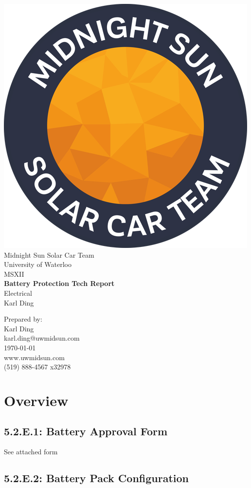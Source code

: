 \documentclass[10pt]{article}
\makeatletter
\newcommand\theteamname{Midnight Sun Solar Car Team} %
\newcommand\theuniversityname{University of Waterloo} %
\newcommand\theteamwebsite{www.uwmidsun.com} %
\newcommand\theteamphone{(519) 888-4567 x32978} %
\newcommand\thetitle{Battery Protection Tech Report} %
\newcommand\thesubtitle{Electrical} %
\newcommand\theauthor{Karl Ding} %
\newcommand\theauthorcontact{karl.ding@uwmidsun.com} %
\newcommand\thedate{\today} %
\makeatother
\begin{document}
\begin{titlepage}
\large
\vspace*{2cm}
\centering
\includegraphics[width=.25\textwidth]{./figures/midnightSunLogoCircle.png} \\
\vspace{1.5cm}
{\LARGE \theteamname} \\
\theuniversityname \\
\vspace{2.2cm}
{\LARGE MSXII} \\
\vspace{0.4cm}
{\huge\bfseries \thetitle} \\
\vspace{0.2cm}
{\LARGE \thesubtitle} \\
\vspace{2.2cm}
\ifdefined \theauthor
\par Prepared by: \\
\theauthor \\
\theauthorcontact \\
\fi
\thedate \\
\vfill
\theteamwebsite \\
\theteamphone
\end{titlepage}

\tableofcontents
\newpage

\section{Overview}

\subsection{5.2.E.1: Battery Approval Form}

See attached form



\subsection{5.2.E.2: Battery Pack Configuration}
\end{document}
